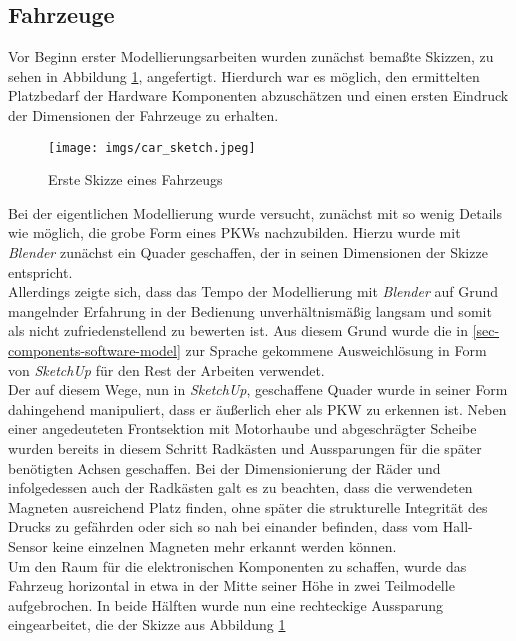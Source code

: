 \documentclass[.../Dokumentation.tex]{subfiles}
\begin{document}
\subsection{Fahrzeuge}\label{sec-ita1-cars}
Vor Beginn erster Modellierungsarbeiten wurden zunächst bemaßte Skizzen, 
zu sehen in Abbildung \ref{fig-car-sketch}, angefertigt. 
Hierdurch war es möglich, den ermittelten Platzbedarf der Hardware 
Komponenten abzuschätzen und einen ersten Eindruck der Dimensionen der 
Fahrzeuge zu erhalten.\\
\begin{figure}[H]
    \begin{center}
    \texttt{[image: imgs/car\_sketch.jpeg]}
    \caption{Erste Skizze eines Fahrzeugs}
    \label{fig-car-sketch}
\end{center}
\end{figure}
\noindent
Bei der eigentlichen Modellierung wurde versucht, zunächst mit so wenig 
Details wie möglich, die grobe Form eines PKWs nachzubilden. Hierzu wurde mit 
\textit{Blender} zunächst ein Quader geschaffen, der in seinen Dimensionen 
der Skizze entspricht.\\
Allerdings zeigte sich, dass das Tempo der Modellierung mit \textit{Blender} 
auf Grund mangelnder Erfahrung in der Bedienung unverhältnismäßig langsam und 
somit als nicht zufriedenstellend zu bewerten ist.
Aus diesem Grund wurde die in 
\ref{sec-components-software-model} zur Sprache gekommene Ausweichlösung in 
Form von \textit{SketchUp} für den Rest der Arbeiten verwendet.\\
Der auf diesem Wege, nun in \textit{SketchUp}, geschaffene Quader wurde in 
seiner Form dahingehend manipuliert, dass er äußerlich eher als PKW zu erkennen 
ist. Neben einer angedeuteten Frontsektion mit Motorhaube und abgeschrägter 
Scheibe wurden bereits in diesem Schritt Radkästen und Aussparungen für die 
später benötigten Achsen geschaffen. 
Bei der Dimensionierung der Räder und infolgedessen auch der Radkästen galt 
es zu beachten, dass die verwendeten Magneten ausreichend Platz finden, 
ohne später die strukturelle Integrität des Drucks zu gefährden oder sich so 
nah bei einander befinden, dass vom Hall-Sensor keine einzelnen Magneten 
mehr erkannt werden können.\\
Um den Raum für die elektronischen Komponenten zu schaffen, wurde das Fahrzeug 
horizontal in etwa in der Mitte seiner Höhe in zwei Teilmodelle aufgebrochen.
In beide Hälften wurde nun eine rechteckige 
Aussparung eingearbeitet, die der Skizze aus Abbildung \ref{fig-car-sketch} 
\end{document}
